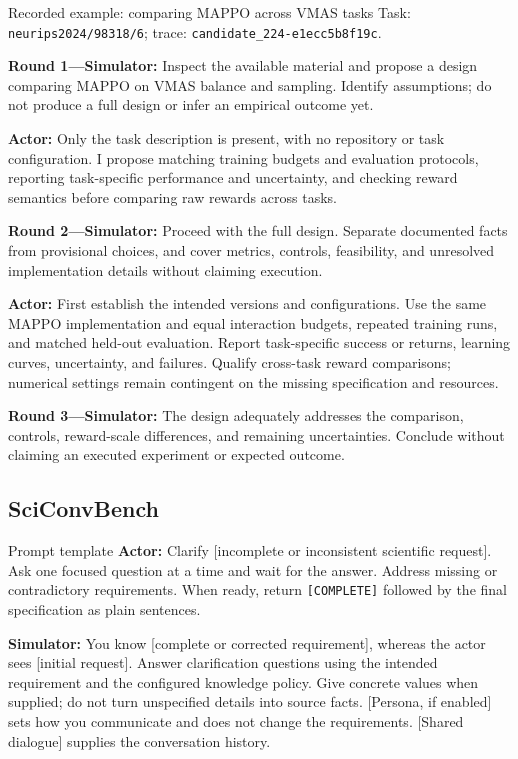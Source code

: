 \begin{promptframe}{Recorded example: comparing MAPPO across VMAS tasks}
Task: \texttt{neurips2024/98318/6};
trace: \texttt{candidate\_224-e1ecc5b8f19c}.
\par\smallskip
\textbf{Round 1---Simulator:} Inspect the available material and propose a
design comparing MAPPO on VMAS balance and sampling. Identify assumptions;
do not produce a full design or infer an empirical outcome yet.\par
\textbf{Actor:} Only the task description is present, with no repository or
task configuration. I propose matching training budgets and evaluation
protocols, reporting task-specific performance and uncertainty, and checking
reward semantics before comparing raw rewards across tasks.\par
\textbf{Round 2---Simulator:} Proceed with the full design. Separate documented
facts from provisional choices, and cover metrics, controls, feasibility,
and unresolved implementation details without claiming execution.\par
\textbf{Actor:} First establish the intended versions and configurations.
Use the same MAPPO implementation and equal interaction budgets, repeated
training runs, and matched held-out evaluation. Report task-specific success
or returns, learning curves, uncertainty, and failures. Qualify cross-task
reward comparisons; numerical settings remain contingent on the missing
specification and resources.\par
\textbf{Round 3---Simulator:} The design adequately addresses the comparison,
controls, reward-scale differences, and remaining uncertainties. Conclude
without claiming an executed experiment or expected outcome.
\end{promptframe}

\subsection{SciConvBench}
\label{app:prompts-sciconvbench}
\begin{promptframe}{Prompt template}
\textbf{Actor:} Clarify [incomplete or inconsistent scientific request]. Ask
one focused question at a time and wait for the answer. Address missing or
contradictory requirements. When ready, return \texttt{[COMPLETE]} followed
by the final specification as plain sentences.\par
\textbf{Simulator:} You know [complete or corrected requirement], whereas
the actor sees [initial request]. Answer clarification questions using the
intended requirement and the configured knowledge policy. Give concrete
values when supplied; do not turn unspecified details into source facts.
[Persona, if enabled] sets how you communicate and does not change the
requirements. [Shared dialogue] supplies the conversation history.
\end{promptframe}

